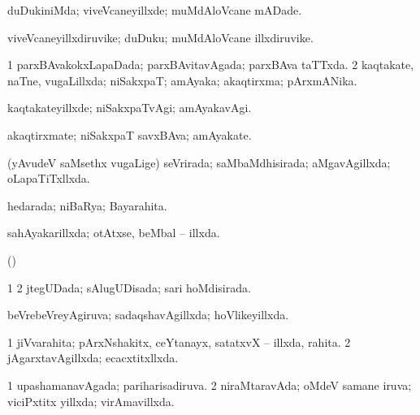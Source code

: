 {\bentry
{} 
\gl{\kirxvi}
\expl{}
\bmng
duDukiniMda; viveVcaneyillxde; muMdAloVcane mADade. 
\emng
\eentry

\bentry
{} 
\gl{\nA}
\expl{}
\bmng
viveVcaneyillxdiruvike; duDuku; muMdAloVcane illxdiruvike. 
\emng
\eentry

\bentry
{} 
\gl{\gu}
\expl{}
\bmng
\bnum
\num{1} parxBAvakokxLapaDada; parxBAvitavAgada; parxBAva taTTxda. 
\num{2} kaqtakate, naTne, \mo vugaLillxda; niSakxpaT; amAyaka; akaqtirxma; pArxmANika. 
\enum
\emng
\eentry

\bentry
{} 
\gl{\kirxvi}
\expl{}
\bmng
kaqtakateyillxde; niSakxpaTvAgi; amAyakavAgi. 
\emng
\eentry

\bentry
{} 
\gl{\nA}
\expl{}
\bmng
akaqtirxmate; niSakxpaT savxBAva; amAyakate. 
\emng
\eentry

\bentry
{} 
\gl{\gu}
\expl{}
\bmng
(yAvudeV saMsethx \mo vugaLige) seVrirada; saMbaMdhisirada; aMgavAgillxda; oLapaTiTxllxda. 
\emng
\eentry

\bentry
{} 
\gl{\gu}
\expl{}
\bmng
hedarada; niBaRya; Bayarahita. 
\emng
\eentry

\bentry
{} 
\gl{\gu}
\expl{}
\bmng
sahAyakarillxda; otAtxse, beMbal -- illxda. 
\emng
\eentry

\bentry
{} 
\gl{\gu}
\expl{}
\bmng
(\nAyxshA)  
\emng
\eentry

\bentry
{} 
\gl{\gu}
\expl{}
\bmng
\bnum
\num{1}  
\num{2} jtegUDada; sAlugUDisada; sari hoMdisirada. 
\enum
\emng
\eentry

\bentry
{} 
\gl{\gu}
\expl{}
\bmng
beVrebeVreyAgiruva; sadaqshavAgillxda; hoVlikeyillxda. 
\emng
\eentry

\bentry
{} 
\gl{\gu}
\expl{}
\bmng
\bnum
\num{1} jiVvarahita; pArxNshakitx, ceYtanayx, satatxvX -- illxda, rahita. 
\num{2} jAgarxtavAgillxda; ecacxtitxllxda. 
\enum
\emng
\eentry

\bentry
{} 
\gl{\gu}
\expl{}
\bmng
\bnum
\num{1} upashamanavAgada; pariharisadiruva. 
\num{2} niraMtaravAda; oMdeV samane iruva; viciPxtitx yillxda; virAmavillxda. 
\enum
\emng
\eentry

}
